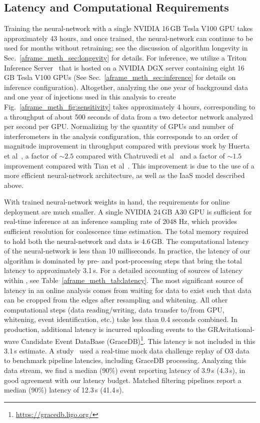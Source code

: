 \begin{refsection}
\section{Latency and Computational Requirements} \label{aframe_meth_sec:compute}
Training the neural-network with a single NVIDIA 16\,GB Tesla V100 GPU takes approximately 43 hours, and once trained, the neural-network can continue to be used for months without retraining; see the discussion of algorithm longevity in Sec.~\ref{aframe_meth_sec:longevity} for details. 
For inference, we utilize a Triton Inference Server~\cite{NVIDIA_Corporation_Triton_Inference_Server} that is hosted on a NVIDIA DGX server containing eight 16\,GB Tesla V100 GPUs (See Sec.~\ref{aframe_meth_sec:inference} for details on inference configuration). 
Altogether, analyzing the one year of background data and one year of injections used in this analysis to create Fig.~\ref{aframe_meth_fig:sensitivity} takes approximately 4 hours, corresponding to a throughput of about 500 seconds of data from a two detector network analyzed per second per GPU. 
Normalizing by the quantity of GPUs and number of interferometers in the analysis configuration, this corresponds to an order of magnitude improvement in throughput compared with previous work by Huerta et al~\cite{huerta2021}, a factor of $\sim2.5$ compared with Chatruvedi et al~\cite{Chaturvedi_2022} and a factor of $\sim1.5$ improvement compared with Tian et al~\cite{Tian_2024}. 
This improvement is due to the use of a more efficient neural-network architecture, as well as the IaaS model described above. 

With trained neural-network weights in hand, the requirements for online deployment are much smaller. 
A single NVIDIA 24\,GB A30 GPU is sufficient for real-time inference at an inference sampling rate of 2048 Hz, which provides sufficient resolution for coalescence time estimation. 
The total memory required to hold both the neural-network and data is 4.6\,GB. The computational latency of the neural-network is less than 10 milliseconds. 
In practice, the latency of our algorithm is dominated by pre- and post-processing steps that bring the total latency to approximately 3.1\,s. 
For a detailed accounting of sources of latency within \aframe, see Table~\ref{aframe_meth_tab:latency}. 
The most significant source of latency in an online analysis comes from waiting for data to exist such that data can be cropped from the edges after resampling and whitening. 
All other computational steps (data reading/writing, data transfer to/from GPU, whitening, event identification, etc.) take less than 0.4 seconds combined. 
In production, additional latency is incurred uploading events to the GRAvitational-wave Candidate Event
DataBase (GraceDB)\footnote{\url{https://gracedb.ligo.org/}}. 
This latency is not included in this 3.1\,s estimate. 
A study~\cite{chaudhary2023lowlatency} used a real-time mock data challenge replay of O3 data to benchmark pipeline latencies, including GraceDB processing. 
Analyzing this data stream, we find a median (90\%) event reporting latency of 3.9\,s (4.3\,s), in good agreement with our latency budget. 
Matched filtering pipelines report a median (90\%) latency of 12.3\,s (41.4\,s).


\end{refsection}
